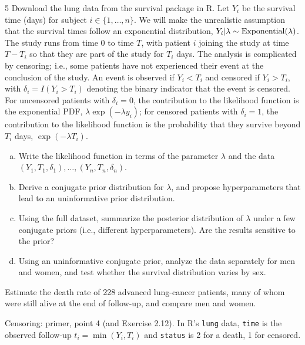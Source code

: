 \documentclass[11pt]{article}
\begin{document}
\begin{problem}{5}
Download the lung data from the survival package in R. Let $Y_i$ be the survival time (days) for subject $i\in\{1,\dots,n\}$. We will make the unrealistic assumption that the survival times follow an exponential distribution, $Y_i|\lambda\sim\mathrm{Exponential}(\lambda)$. The study runs from time 0 to time $T$, with patient $i$ joining the study at time $T-T_i$ so that they are part of the study for $T_i$ days. The analysis is complicated by censoring; i.e., some patients have not experienced their event at the conclusion of the study. An event is observed if $Y_i<T_i$ and censored if $Y_i>T_i$, with $\delta_i=I(Y_i>T_i)$ denoting the binary indicator that the event is censored. For uncensored patients with $\delta_i=0$, the contribution to the likelihood function is the exponential PDF, $\lambda\exp(-\lambda y_i)$; for censored patients with $\delta_i=1$, the contribution to the likelihood function is the probability that they survive beyond $T_i$ days, $\exp(-\lambda T_i)$.
\begin{enumerate}[(a)]
\item Write the likelihood function in terms of the parameter $\lambda$ and the data $(Y_1,T_1,\delta_1),\dots,(Y_n,T_n,\delta_n)$.
\item Derive a conjugate prior distribution for $\lambda$, and propose hyperparameters that lead to an uninformative prior distribution.
\item Using the full dataset, summarize the posterior distribution of $\lambda$ under a few conjugate priors (i.e., different hyperparameters). Are the results sensitive to the prior?
\item Using an uninformative conjugate prior, analyze the data separately for men and women, and test whether the survival distribution varies by sex.
\end{enumerate}
\end{problem}

\begin{restate}
Estimate the death rate of 228 advanced lung-cancer patients, many of whom were still alive at the end of follow-up, and compare men and women.
\end{restate}

\begin{recall}
Censoring: primer, point 4 (and Exercise 2.12). In R's \texttt{lung} data, \texttt{time} is the observed follow-up $t_i=\min(Y_i,T_i)$ and \texttt{status} is 2 for a death, 1 for censored.
\end{recall}
\end{document}
